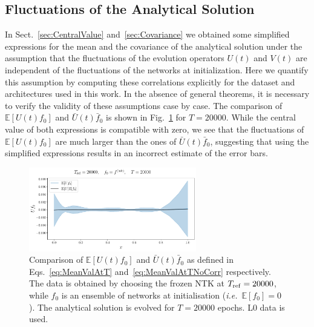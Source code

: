 \FloatBarrier

\subsection{Fluctuations of the Analytical Solution}
\label{sec:CheckCovariance}

In Sect.~\ref{sec:CentralValue} and~\ref{sec:Covariance} we obtained some simplified expressions 
for the mean and the covariance of the analytical solution under the assumption that the fluctuations
of the evolution operators $U(t)$ and $V(t)$ are independent of the fluctuations of the networks 
at initialization. Here we quantify this assumption by computing these correlations explicitly 
for the dataset and architectures used in this work. In the absence of general theorems, it is necessary 
to verify the validity of these assumptions case by case. The comparison of 
$\mathbb{E}\left[U(t) f_{0}\right]$ and $\bar{U}(t) \bar{f}_{0}$ is shown in Fig.~\ref{fig:xT3_exp_val} for
$T=20000$. 
While the central value of both expressions is compatible with zero, we see that the fluctuations of 
$\mathbb{E}\left[U(t) f_{0}\right]$ are much larger than the ones of $\bar{U}(t) \bar{f}_{0}$, suggesting 
that using the simplified expressions results in an incorrect estimate of the error bars. 

\begin{figure}[t!]
  \centering
  \includegraphics[width=0.65\textwidth]{plots/u_v_studies/u_f0_independence_20000_L0.pdf}
  \caption{Comparison of $\mathbb{E}\left[U(t) f_{0}\right]$ and $\bar{U}(t) \bar{f}_{0}$ as defined in 
    Eqs.~\eqref{eq:MeanValAtT} and~\eqref{eq:MeanValAtTNoCorr} respectively. 
    The data is obtained by choosing the frozen NTK at $T_{\rm
    ref} = 20000$, while $f_0$ is an ensemble of networks at initialisation
    (\textit{i.e.}\ $\mathbb{E}[f_0]=0$). The analytical solution is evolved for
    $T=20000$ epochs. L0 data is used.}
    \label{fig:xT3_exp_val}
  \end{figure}

\FloatBarrier

